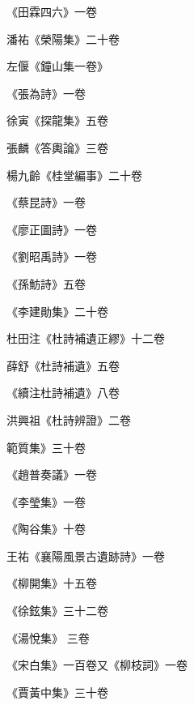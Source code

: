 \begin{pinyinscope}
 《田霖四六》一卷



 潘祐《榮陽集》二十卷



 左偃《鐘山集一卷》



 《張為詩》一卷



 徐寅《探龍集》五卷



 張麟《答輿論》三卷



 楊九齡《桂堂編事》二十卷



 《蔡昆詩》一卷



 《廖正圖詩》一卷



 《劉昭禹詩》一卷



 《孫魴詩》五卷



 《李建勛集》二十卷



 杜田注《杜詩補遺正繆》十二卷



 薛舒《杜詩補遺》五卷



 《續注杜詩補遺》八卷



 洪興祖《杜詩辨證》二卷



 範質集》三十卷



 《趙普奏議》一卷



 《李瑩集》一卷



 《陶谷集》十卷



 王祐《襄陽風景古遺跡詩》一卷



 《柳開集》十五卷



 《徐鉉集》三十二卷



 《湯悅集》
 三卷



 《宋白集》一百卷又《柳枝詞》一卷



 《賈黃中集》三十卷




\end{pinyinscope}
